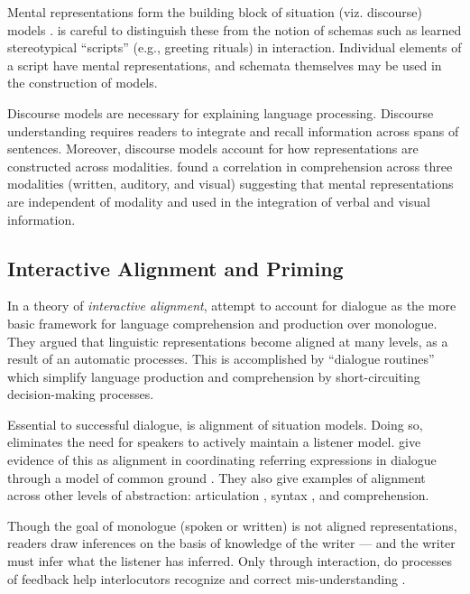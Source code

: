 Mental representations form the building block of situation (viz. discourse) models  \citep{Zwaan:2002va,Zwaan:2013wk}. \citet{Zwaan:2013wk}  is careful to distinguish these from the notion of schemas such as learned stereotypical ``scripts'' (e.g., greeting rituals) in interaction. Individual elements of a script have mental representations, and schemata themselves may be used in the construction of models.

Discourse models are necessary for explaining language processing. Discourse understanding requires readers to integrate and recall information across spans of sentences. Moreover, discourse models account for how representations are constructed across modalities.  \citet*{Gernsbacher:2013vl,Zwaan:1999td}  found a correlation in comprehension across three modalities (written, auditory, and visual) suggesting that mental representations are independent of modality and used in the integration of verbal and visual information. 

\subsection{Interactive Alignment and Priming}
\label{interactivealignmentandpriming}

In a theory of \emph{interactive alignment},  \citet{Pickering:2003uy}  attempt to account for dialogue as the more basic framework for language comprehension and production over monologue. They argued that linguistic representations become aligned at many levels, as a result of an automatic processes. This is accomplished by ``dialogue routines'' which simplify language production and comprehension by short-circuiting decision-making processes.

Essential to successful dialogue, is alignment of situation models. Doing so, eliminates the need for speakers to actively maintain a listener model. \citet{Pickering:2003uy} give evidence of this as alignment in coordinating referring expressions in dialogue through a model of common ground \citep{Brennan:1996ud,Clark:2003uw,WilkesGibbs:1992ui}. They also give examples of alignment across other levels of abstraction: articulation \citep{Bard:2000bp}, syntax \citep{Branigan:2007ug}, and comprehension. 

Though the goal of monologue (spoken or written) is not aligned representations, readers draw inferences on the basis of knowledge of the writer --- and the writer must infer what the listener has inferred. Only through interaction, do processes of feedback help interlocutors recognize and correct mis-understanding  \citep{Clark:1996tm}.  

